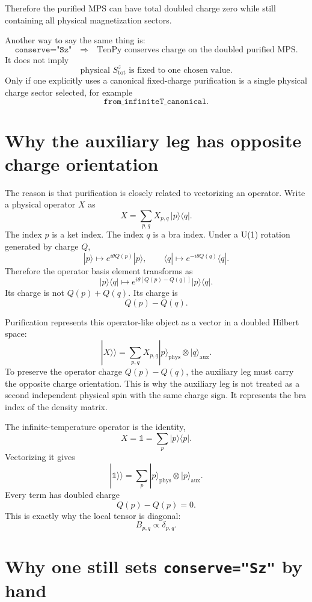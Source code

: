 \documentclass[11pt]{article}
\newcommand{\Id}{\mathbb{1}}
\newcommand{\Q}{Q}
\begin{document}
Therefore the purified MPS can have total doubled charge zero while still
containing all physical magnetization sectors.

Another way to say the same thing is:
\[
\texttt{conserve="Sz"}
\quad\Longrightarrow\quad
\text{TenPy conserves charge on the doubled purified MPS.}
\]
It does not imply
\[
\text{physical } S^z_{\mathrm{tot}} \text{ is fixed to one chosen value.}
\]
Only if one explicitly uses a canonical fixed-charge purification is a single
physical charge sector selected, for example
\[
\texttt{from\_infiniteT\_canonical}.
\]

\section{Why the auxiliary leg has opposite charge orientation}

The reason is that purification is closely related to vectorizing an operator.
Write a physical operator \(X\) as
\[
X=\sum_{p,q} X_{p,q}\, |p\rangle\langle q|.
\]
The index \(p\) is a ket index. The index \(q\) is a bra index. Under a U(1)
rotation generated by charge \(\Q\),
\[
|p\rangle \mapsto e^{i\theta \Q(p)}|p\rangle,
\qquad
\langle q| \mapsto e^{-i\theta \Q(q)}\langle q|.
\]
Therefore the operator basis element transforms as
\[
|p\rangle\langle q|
\mapsto
e^{i\theta[\Q(p)-\Q(q)]}
|p\rangle\langle q|.
\]
Its charge is not \(\Q(p)+\Q(q)\). Its charge is
\[
\Q(p)-\Q(q).
\]

Purification represents this operator-like object as a vector in a doubled
Hilbert space:
\[
|X\rangle\rangle
=
\sum_{p,q} X_{p,q}
|p\rangle_{\mathrm{phys}}
\otimes
|q\rangle_{\mathrm{aux}}.
\]
To preserve the operator charge \(\Q(p)-\Q(q)\), the auxiliary leg must carry
the opposite charge orientation. This is why the auxiliary leg is not treated as
a second independent physical spin with the same charge sign. It represents the
bra index of the density matrix.

The infinite-temperature operator is the identity,
\[
X=\Id=\sum_p |p\rangle\langle p|.
\]
Vectorizing it gives
\[
|\Id\rangle\rangle
=
\sum_p |p\rangle_{\mathrm{phys}}\otimes |p\rangle_{\mathrm{aux}}.
\]
Every term has doubled charge
\[
\Q(p)-\Q(p)=0.
\]
This is exactly why the local tensor is diagonal:
\[
B_{p,q}\propto\delta_{p,q}.
\]

\section{Why one still sets \texttt{conserve="Sz"} by hand}
\end{document}
